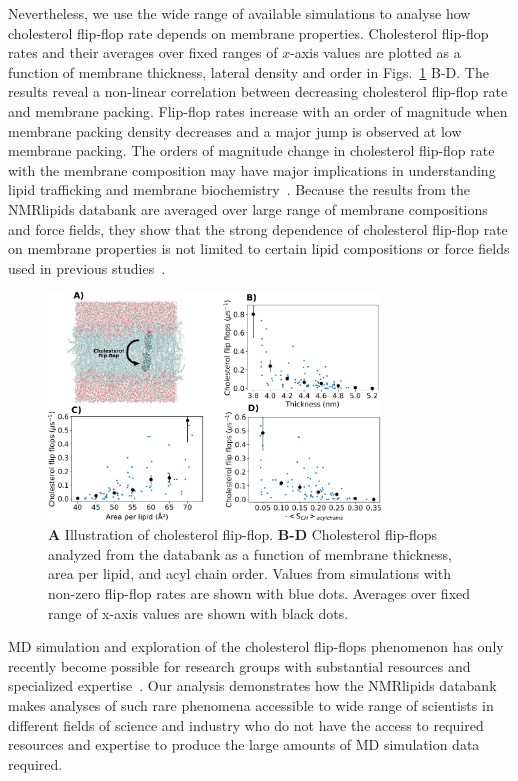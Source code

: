 \documentclass[fleqn,10pt]{wlscirep}
\begin{document}
Nevertheless, we use the wide range of available simulations to analyse how cholesterol flip-flop rate depends on membrane properties. Cholesterol flip-flop rates and their averages over fixed ranges of $x$-axis values are plotted as a function of membrane thickness, lateral density and order in Figs.~\ref{fig:flip-flops} B-D. The results reveal a non-linear correlation between decreasing cholesterol flip-flop rate and membrane packing. Flip-flop rates increase with an order of magnitude when membrane packing density decreases and a major jump is observed at low membrane packing. The orders of magnitude change in cholesterol flip-flop rate with the membrane composition may have major implications in understanding lipid trafficking and membrane biochemistry~\cite{gu19,baral20}. Because the results from the NMRlipids databank are averaged over large range of membrane compositions and force fields, they show that the strong dependence of cholesterol flip-flop rate on membrane properties is not limited to certain lipid compositions or force fields used in previous studies~\cite{gu19,javanainen19,baral20}.

\begin{figure}[htb]
    \centering
    \includegraphics[width=88mm]{Figures/CholFlipFlops.pdf}
    \caption{{\bf A} Illustration of cholesterol flip-flop.  
      {\bf B-D} Cholesterol flip-flops analyzed from the databank as a function of membrane thickness, area per lipid, and acyl chain order. Values from simulations with non-zero flip-flop rates are shown with blue dots. Averages over fixed range of x-axis values are shown with black dots.
    }
    \label{fig:flip-flops}
\end{figure}

MD simulation and exploration of the cholesterol flip-flops phenomenon has only recently become possible for research groups with substantial resources and specialized expertise~\cite{gu19,javanainen19,baral20}. Our analysis demonstrates how the NMRlipids databank makes analyses of such rare phenomena accessible to wide range of scientists in different fields of science and industry who do not have the access to required resources and expertise to produce the large amounts of MD simulation data required. 
\end{document}
